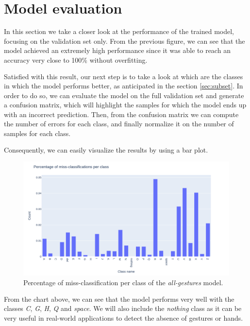 \documentclass{Configuration_Files/PoliMi3i_thesis}
\begin{document}
\section{Model evaluation}
\label{sec:all-evaluation}
In this section we take a closer look at the performance of the trained model, focusing on the validation set only. From the previous figure, we can see that the model achieved an extremely high performance since it was able to reach an accuracy very close to 100\% without overfitting. 

Satisfied with this result, our next step is to take a look at which are the classes in which the model performs better, as anticipated in the section \ref{sec:subset}.  In order to do so, we can evaluate the model on the full validation set and generate a confusion matrix, which will highlight the samples for which the model ends up with an incorrect prediction. Then, from the confusion matrix we can compute the number of errors for each class, and finally normalize it on the number of samples for each class.

Consequently, we can easily visualize the results by using a bar plot. 

\begin{figure}[H]
   \centering
   \includegraphics[width=\textwidth]{Figures/all-gestures/all_errors.png}
   \caption{Percentage of miss-classification per class of the \textit{all-gestures} model.}
   \label{fig:all_errors}
\end{figure}

From the chart above, we can see that the model performs very well with the classes \textit{C}, \textit{G}, \textit{H}, \textit{Q} and \textit{space}. We will also include the \textit{nothing} class as it can be very useful in real-world applications to detect the absence of gestures or hands.
\end{document}
